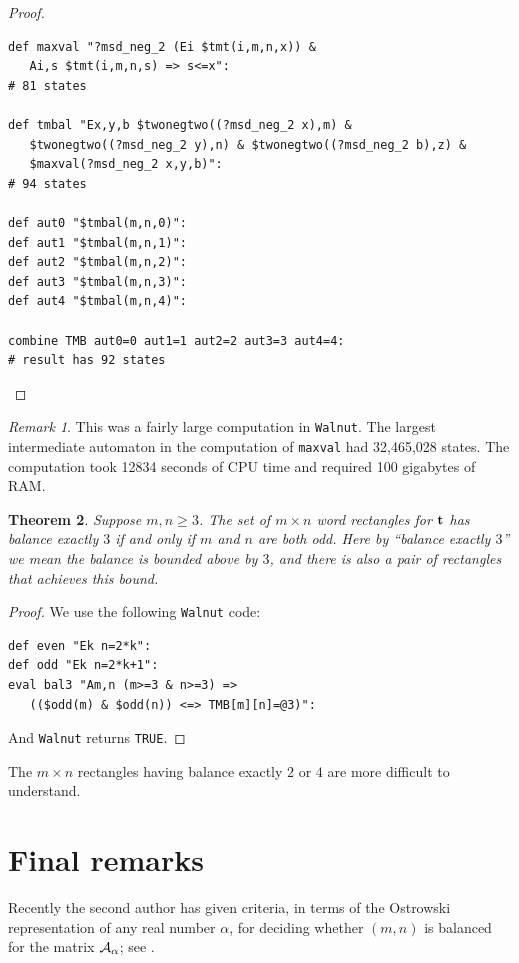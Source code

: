 \documentclass[final]{dmtcs-episciences}
\theoremstyle{plain}
\newtheorem{theorem}{Theorem}
\theoremstyle{remark}
\newtheorem{remark}[theorem]{Remark}
\begin{document}
\begin{proof}
\begin{verbatim}
def maxval "?msd_neg_2 (Ei $tmt(i,m,n,x)) & 
   Ai,s $tmt(i,m,n,s) => s<=x":
# 81 states

def tmbal "Ex,y,b $twonegtwo((?msd_neg_2 x),m) & 
   $twonegtwo((?msd_neg_2 y),n) & $twonegtwo((?msd_neg_2 b),z) &
   $maxval(?msd_neg_2 x,y,b)":
# 94 states

def aut0 "$tmbal(m,n,0)":
def aut1 "$tmbal(m,n,1)":
def aut2 "$tmbal(m,n,2)": 
def aut3 "$tmbal(m,n,3)":
def aut4 "$tmbal(m,n,4)":

combine TMB aut0=0 aut1=1 aut2=2 aut3=3 aut4=4:
# result has 92 states 
\end{verbatim}\vspace{-\baselineskip}
\end{proof}

\begin{remark}
This was a fairly large computation in {\tt Walnut}.  The largest intermediate automaton in the computation of {\tt maxval} had 32,465,028 states.  The computation
took 12834 seconds of CPU
time and required 100 gigabytes of RAM.
\end{remark}

\begin{theorem}
Suppose $m, n\geq 3$. The set of $m \times n$ word rectangles for $\bf t$ has balance exactly $3$ if and only if $m$ and $n$ are both odd.  Here by ``balance exactly $3$'' we mean the balance is bounded above by $3$, and there is also a pair of rectangles that achieves this bound.
\end{theorem}

\begin{proof}
We use the following {\tt Walnut} code:
\begin{verbatim}
def even "Ek n=2*k":
def odd "Ek n=2*k+1":
eval bal3 "Am,n (m>=3 & n>=3) => 
   (($odd(m) & $odd(n)) <=> TMB[m][n]=@3)":
\end{verbatim}
And {\tt Walnut} returns {\tt TRUE}.
\end{proof}

The $m \times n$ rectangles having balance exactly $2$ or $4$ are more
difficult to understand.

\section{Final remarks}

Recently the second author has given criteria, in terms of the Ostrowski representation of any real number $\alpha$, for deciding whether $(m,n)$ is balanced for the matrix ${\cal A}_{\alpha}$; see \cite{Vukusic:2026}.
\end{document}
